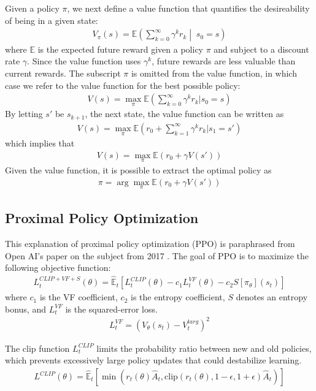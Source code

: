 \documentclass{article}
\begin{document}
Given a policy $\pi$, we next define a value function that quantifies the desireability of being in a given state:
\begin{align*}
  V_\pi (s) = \mathbb{E} \left( \sum_{k=0}^{\infty}\gamma^k r_k \middle|\; s_0 = s \right)
\end{align*}
where $\mathbb{E}$ is the expected future reward given a policy $\pi$ and subject to a discount rate $\gamma$. Since the value function uses $\gamma^k$, future rewards are less valuable than current rewards. The subscript $\pi$ is omitted from the value function, in which case we refer to the value function for the best possible policy:
\begin{align*}
  V(s) = \max_\pi \mathbb{E}\left( \sum_{k=0}^{\infty}\gamma^k r_k | s_0 = s \right)
\end{align*}
By letting $s'$ be $s_{k+1}$, the next state, the value function can be written as
\begin{align*}
  V(s) = \max_\pi \mathbb{E}\left( r_0 + \sum_{k=1}^{\infty}\gamma^k r_k | s_1 = s' \right)
\end{align*}
which implies that
\begin{align*}
  V(s)=\max_\pi \mathbb{E}(r_0 + \gamma V(s'))
\end{align*}
Given the value function, it is possible to extract the optimal policy as
\begin{align*}
  \pi = \arg\max_\pi \mathbb{E}(r_0 + \gamma V(s'))
\end{align*}

\subsection{Proximal Policy Optimization}
This explanation of proximal policy optimization (PPO) is paraphrased from Open AI's paper on the subject from 2017 \cite{schulman_proximal_2017}. The goal of PPO is to maximize the following objective function:
\begin{align*}
  L_t^{CLIP+VF+S}(\theta) = \hat{\mathbb{E}}_t[L_t^{CLIP}(\theta)-c_1L_t^{VF}(\theta)-c_2S[\pi_\theta](s_t)]
\end{align*}
where $c_1$ is the VF coefficient, $c_2$ is the entropy coefficient, $S$ denotes an entropy bonus, and $L_t^{VF}$ is the squared-error loss.
\begin{align*}
  L_t^{VF} = (V_\theta(s_t)-V_t^{targ})^2
\end{align*}

The clip function $L_t^{CLIP}$ limits the probability ratio between new and old policies, which prevents excessively large policy updates that could destabilize learning.
\begin{align*}
  L^{CLIP}(\theta) = \hat{\mathbb{E}}_t\left[ \min(r_t(\theta)\hat{A}_t, \text{clip}(r_t(\theta), 1-\epsilon, 1+\epsilon)\hat{A}_t) \right]
\end{align*}
\end{document}
